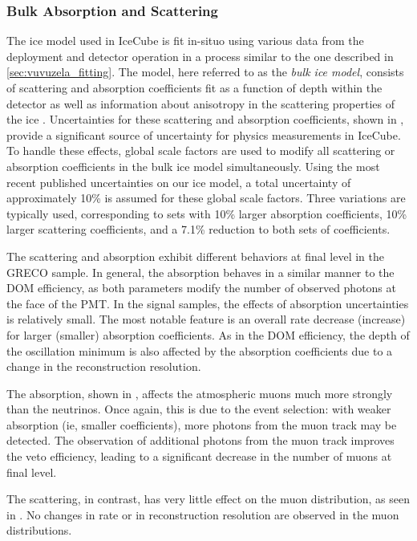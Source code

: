 \subsubsection{Bulk Absorption and Scattering}
\label{subsubsec:bulkice}
The ice model used in IceCube is fit in-situo using various data from the deployment and detector operation in a process similar to the one described in \ref{sec:vuvuzela_fitting}.
The model, here referred to as the \emph{bulk ice model}, consists of scattering and absorption coefficients fit as a function of depth within the detector as well as information about anisotropy in the scattering properties of the ice .
Uncertainties for these scattering and absorption coefficients, shown in , provide a significant source of uncertainty for physics measurements in IceCube.
To handle these effects, global scale factors are used to modify all scattering or absorption coefficients in the bulk ice model simultaneously.
Using the most recent published uncertainties on our ice model, a total uncertainty of approximately 10\% is assumed for these global scale factors.
Three variations are typically used, corresponding to sets with 10\% larger absorption coefficients, 10\% larger scattering coefficients, and a 7.1\% reduction to both sets of coefficients.

The scattering and absorption exhibit different behaviors at final level in the GRECO sample.
In general, the absorption behaves in a similar manner to the DOM efficiency, as both parameters modify the number of observed photons at the face of the PMT.
In the signal samples, the effects of absorption uncertainties is relatively small.
The most notable feature is an overall rate decrease (increase) for larger (smaller) absorption coefficients.
As in the DOM efficiency, the depth of the oscillation minimum is also affected by the absorption coefficients due to a change in the reconstruction resolution.

The absorption, shown in , affects the atmospheric muons much more strongly than the neutrinos.
Once again, this is due to the event selection: with weaker absorption (ie, smaller coefficients), more photons from the muon track may be detected.
The observation of additional photons from the muon track improves the veto efficiency, leading to a significant decrease in the number of muons at final level.

The scattering, in contrast, has very little effect on the muon distribution, as seen in .
No changes in rate or in reconstruction resolution are observed in the muon distributions.

